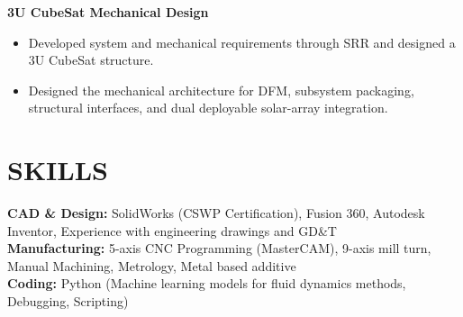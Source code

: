 \documentclass[10pt]{article}
\begin{document}
\vspace{.2em}

\textbf{3U CubeSat Mechanical Design}
\begin{itemize}
\item Developed system and mechanical requirements through SRR and designed a 3U CubeSat structure.
\item Designed the mechanical architecture for DFM, subsystem packaging, structural interfaces, and dual deployable solar-array integration.
\end{itemize}


\vspace{.2em}

\section*{SKILLS}

\textbf{CAD \& Design:} SolidWorks (CSWP Certification), Fusion 360, Autodesk Inventor, Experience with engineering drawings and GD\&T \\
\textbf{Manufacturing:} 5-axis CNC Programming (MasterCAM), 9-axis mill turn, Manual Machining, Metrology, Metal based additive \\
\textbf{Coding:} Python (Machine learning models for fluid dynamics methods, Debugging, Scripting)
\end{document}
